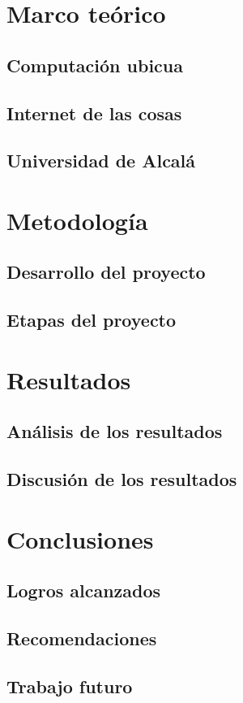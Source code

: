 \documentclass[12pt]{report}
\begin{document}
\chapter{Marco teórico}
\section{Computación ubicua}
\lipsum[1-2]
\newpage
\section{Internet de las cosas}
\lipsum[3-4]
\newpage
\section{Universidad de Alcalá}
\lipsum[5-6]

\chapter{Metodología}
\section{Desarrollo del proyecto}
\lipsum[1-2]
\newpage
\section{Etapas del proyecto}
\lipsum[3-4]

\chapter{Resultados}
\section{Análisis de los resultados}
\lipsum[1-2]
\newpage
\section{Discusión de los resultados}
\lipsum[3-4]

\chapter{Conclusiones}
\section{Logros alcanzados}
\lipsum[1-2]
\newpage
\section{Recomendaciones}
\lipsum[3-4]
\newpage
\section{Trabajo futuro}
\lipsum[5-6]
\end{document}
